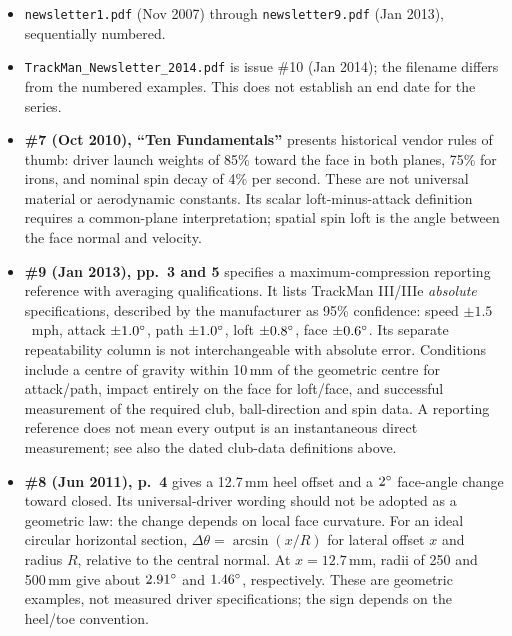 \begin{itemize}\itemsep2pt
\item \texttt{newsletter1.pdf} (Nov 2007) through \texttt{newsletter9.pdf}
  (Jan 2013), sequentially numbered.
\item \texttt{TrackMan\_Newsletter\_2014.pdf} is issue \#10 (Jan 2014); the
  filename differs from the numbered examples. This does not establish an
  end date for the series.
\item \textbf{\#7 (Oct 2010), ``Ten Fundamentals''} presents historical
  vendor rules of thumb: driver launch weights of 85\% toward the face in
  both planes, 75\% for irons, and nominal spin decay of 4\% per second.
  These are not universal material or aerodynamic constants. Its scalar
  loft-minus-attack definition requires a common-plane interpretation;
  spatial spin loft is the angle between the face normal and velocity.
\item \textbf{\#9 (Jan 2013), pp.\ 3 and 5} specifies a maximum-compression
  reporting reference with averaging qualifications. It lists TrackMan
  III/IIIe \emph{absolute} specifications, described by the manufacturer as
  95\% confidence: speed $\pm1.5$~mph, attack $\pm1.0\si{\degree}$, path
  $\pm1.0\si{\degree}$, loft $\pm0.8\si{\degree}$, face $\pm0.6\si{\degree}$. Its separate
  repeatability column is not interchangeable with absolute error.
  Conditions include a centre of gravity within 10\,mm of the geometric
  centre for attack/path, impact entirely on the face for loft/face, and
  successful measurement of the required club, ball-direction and spin data.
  A reporting reference does not mean every output is an instantaneous
  direct measurement; see also the dated club-data definitions above.
\item \textbf{\#8 (Jun 2011), p.\ 4} gives a 12.7\,mm heel offset and a
  $2\si{\degree}$ face-angle change toward closed. Its universal-driver wording
  should not be adopted as a geometric law: the change depends on local face curvature.
  For an ideal circular horizontal section, $\Delta\theta=\arcsin(x/R)$
  for lateral offset $x$ and radius $R$, relative to the central normal.
  At $x=12.7$\,mm, radii of 250 and 500\,mm give about $2.91\si{\degree}$ and
  $1.46\si{\degree}$, respectively. These are geometric examples, not measured
  driver specifications; the sign depends on the heel/toe convention.
\end{itemize}


